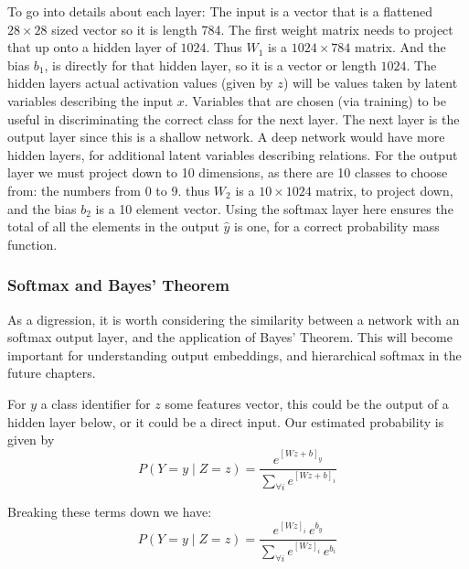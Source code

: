 \documentclass[12pt,parskip]{komatufte}
\begin{document}

To go into details about each layer:
The input is a vector that is a flattened $28\times 28$ sized vector so it is length 784.
The first weight matrix needs to project that up onto a hidden layer  of $1024$.
Thus $W_1$ is a $1024\times 784$ matrix.
And the bias $b_1$, is directly for that hidden layer, so it is a vector or length $1024$.
The hidden layers actual activation values (given by $z$) will be values taken by latent variables describing the input $x$.
Variables that are chosen (via training) to be useful in discriminating the correct class for the next layer.
The next layer is the output layer since this is a shallow network.
A deep network would have more hidden layers, for additional latent variables describing relations.
For the output layer we must project down to 10 dimensions, as there are 10 classes to choose from: the numbers from 0 to 9.
thus $W_2$ is a $10 \times 1024$ matrix, to project down,
and the bias $b_2$ is a 10 element vector.
Using the softmax layer here ensures the total of all the elements in the output $\hat{y}$ is one, for a correct probability mass function.


\subsubsection{Softmax and Bayes' Theorem}\label{sec:softmax-and-bayes-theorem}
As a digression, it is worth considering the similarity between a network with an softmax output layer, and the application of Bayes' Theorem.
This will become important for understanding output embeddings, and hierarchical softmax in the future chapters.

For $y$ a class identifier
for $z$ some features vector, this could be the output of a hidden layer below, or it could be a direct input.
Our estimated probability is given by
\begin{equation}
P(Y=y\mid Z=z)=\frac{e^{[Wz+b]_{y}}}{\sum_{\forall i}e^{[Wz+b]_{i}}}
\end{equation}

Breaking these terms down we have:
\begin{equation}
P(Y=y\mid Z=z)=\frac{e^{[Wz]_{i}}\,e^{b_{y}}}{\sum_{\forall i}e^{[Wz]_{i}}\,e^{b_{i}}}
\end{equation}
\end{document}
